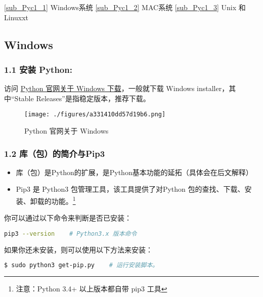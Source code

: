 
\autoref{sub_Pyc1_1} Windows系统
\autoref{sub_Pyc1_2} MAC系统
\autoref{sub_Pyc1_3} Unix 和 Linuxxt

\subsection{Windows}\label{sub_Pyc1_1} 

\subsubsection{1.1 安装 Python:}
访问 \href{https://www.python.org/downloads/windows/}{Python 官网关于 Windows 下载}，一般就下载  Windows installer，其中“Stable Releases”是指稳定版本，推荐下载。
\begin{figure}[ht]
\centering
\texttt{[image: ./figures/a331410dd57d19b6.png]}
\caption{Python 官网关于 Windows} \label{fig_Python_1}
\end{figure}
\subsubsection{1.2 库（包）的简介与Pip3}

\begin{itemize}
\item 库（包）是Python的扩展，是Python基本功能的延拓（具体会在后文解释）
\item Pip3 是 Python3 包管理工具，该工具提供了对Python 包的查找、下载、安装、卸载的功能。\footnote{注意：Python 3.4+ 以上版本都自带 pip3 工具}
\end{itemize}

你可以通过以下命令来判断是否已安装：


\begin{lstlisting}[language=bash]
pip3 --version    # Python3.x 版本命令
\end{lstlisting}

如果你还未安装，则可以使用以下方法来安装：

\begin{lstlisting}[language=bash]
$ sudo python3 get-pip.py    # 运行安装脚本。
\end{lstlisting}

